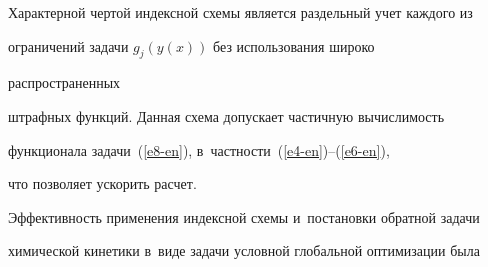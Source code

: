 

   


  Характерной чертой индексной схемы является раздельный учет каждого из 


ограничений задачи $g_j(y(x))$  без использования широко


 распространенных 


штрафных функций. Данная схема допускает частичную вы\-чис\-ли\-мость 


функционала задачи~(\ref{e8-en}), в~част\-ности~(\ref{e4-en})--(\ref{e6-en}), 


что позволяет ускорить расчет.


  


  Эффективность применения индексной схемы и~постановки обратной задачи 


химической кинетики в~виде задачи условной глобальной оптимизации была 


